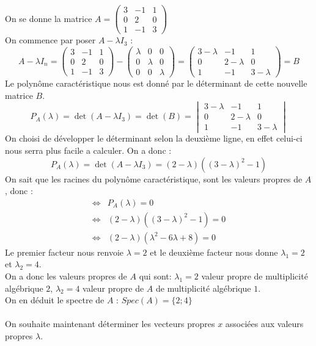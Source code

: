 \begin{ex}
On se donne la matrice $A=\begin{pmatrix}3&-1&1\\0&2&0\\1&-1&3\end{pmatrix}$\\
On commence par poser $A-\lambda I_3$ :
$$A-\lambda I_n = \begin{pmatrix}3&-1&1\\0&2&0\\1&-1&3\end{pmatrix}-\begin{pmatrix}\lambda&0&0\\0&\lambda&0\\0&0&\lambda\end{pmatrix}=\begin{pmatrix}3-\lambda&-1&1\\0&2-\lambda&0\\1&-1&3-\lambda\end{pmatrix}=B$$
Le polynôme caractéristique nous est donné par le déterminant de cette nouvelle matrice $B$.
$$P_A(\lambda)=\det(A-\lambda I_3)=\det(B)=\begin{vmatrix}3-\lambda&-1&1\\0&2-\lambda&0\\1&-1&3-\lambda\end{vmatrix}$$
On choisi de développer le déterminant selon la deuxième ligne, en effet celui-ci nous serra plus facile a calculer.  On a donc :
$$P_A(\lambda)=\det(A-\lambda I_3)=(2-\lambda)((3-\lambda)^2-1)$$
On sait que les racines du polynôme caractéristique, sont les valeurs propres de $A$, donc :
\begin{align*}
    \Leftrightarrow & P_A(\lambda) = 0\\
    \Leftrightarrow & (2-\lambda)((3-\lambda)^2-1) = 0\\
    \Leftrightarrow & (2-\lambda)(\lambda^2-6\lambda+8) = 0
\end{align*}
Le premier facteur nous renvoie $\lambda = 2$ et le deuxième facteur nous donne $\lambda_1=2$ et $\lambda_2=4$.\\
On a donc les valeurs propres de $A$ qui sont: $\lambda_1 =2$ valeur propre de multiplicité algébrique $2$, $\lambda_2=4$ valeur propre de $A$ de multiplicité algébrique $1$.\\
On en déduit le spectre de $A$ : $Spec(A)=\{2;4\}$
\\
\\
On souhaite maintenant déterminer les vecteurs propres $x$ associées aux valeurs propres $\lambda$.\\

\end{ex}
